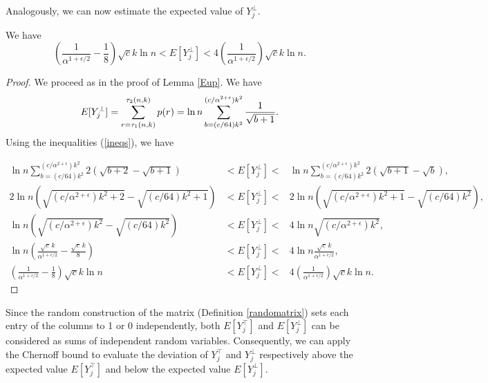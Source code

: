 \documentclass[11pt]{article}
\begin{document}
Analogously, we can now estimate the expected value of $Y^{\perp}_j$.
\begin{lemma}\label{Edown}
We have
\[
  \left (\frac{1}{\alpha^{1+\epsilon/2}} - \frac{1}{8} \right )\sqrt{c} k \ln n  
      < E[Y^{\perp}_j] < 
   4 \left (\frac{1}{\alpha^{1 + \epsilon/2}}  \right )\sqrt{c} k \ln n .
\]
\end{lemma}
\begin{proof}
We proceed as in the proof of Lemma \ref{Eup}. We have
\[
	E[Y^{\perp}_j] 
                =    \sum_{r=\tau_1(n,k)}^{\tau_2(n,k)} p(r) \nonumber\\
	            =    \ln n \sum_{b= (c /64)  k^2}^{(c/\alpha^{2 + \epsilon}) k^2} \frac{1}{\sqrt{b +1}}.
\]
Using the inequalities (\ref{ineqs}), we have

\begin{eqnarray*}
  \ln n \sum_{b= (c /64) k^2}^{(c/\alpha^{2 + \epsilon}) k^2} 2\left( \sqrt{b+2} - \sqrt{b+1} \right)  
  & < E[Y^{\perp}_j] < &
  \ln n \sum_{b= (c /64) k^2}^{(c/\alpha^{2 + \epsilon}) k^2} 2 \left( \sqrt{b+1} - \sqrt{b} \right), \\
  2 \ln n \left( \sqrt{(c/\alpha^{2 + \epsilon}) k^2 + 2} - \sqrt{(c /64)  k^2+1} \right)
   & < E[Y^{\perp}_j] < &
2  \ln n \left( \sqrt{(c/\alpha^{2 + \epsilon}) k^2 + 1} - \sqrt{(c /64)  k^2} \right), \\
\ln n \left( \sqrt{(c/\alpha^{2 + \epsilon}) k^2 } - \sqrt{(c / 64)  k^2} \right)
   & < E[Y^{\perp}_j] < &
4\ln n \sqrt{(c/\alpha^{2 + \epsilon}) k^2 }, \\  
\ln n \left( \frac{\sqrt{c}\,k}{\alpha^{1 + \epsilon/2} } - \frac{\sqrt{c}\, k}{8 } \right)
   & < E[Y^{\perp}_j] < &
  4\ln n \frac{\sqrt{c}\,k}{\alpha^{1 + \epsilon/2} }, \\
  \left (\frac{1}{\alpha^{1+\epsilon/2}} - \frac{1}{8} \right )\sqrt{c} k \ln n  
     & < E[Y^{\perp}_j] < &
   4 \left (\frac{1}{\alpha^{1 + \epsilon/2}}  \right )\sqrt{c} k \ln n .
\end{eqnarray*}

\end{proof}

Since the random construction of the matrix (Definition \ref{randomatrix}) sets each entry of the columns to 1 or 0
independently, both $E[Y^{\top}_j]$ and $E[Y^{\perp}_j]$ can be considered as sums of independent random variables. 
Consequently, we can apply the Chernoff bound to evaluate the deviation of $Y^{\top}_j$ and $Y^{\perp}_j$
respectively above the expected value $E[Y^{\top}_j]$ and below the expected value $E[Y^{\perp}_j]$.
\end{document}
